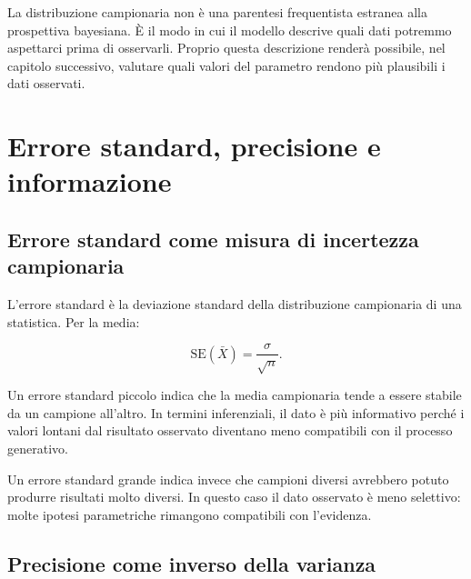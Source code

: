 \documentclass[
  italian,
  letterpaper,
  a4paper,
  11pt,
  open=any]{scrbook}
\theoremstyle{plain}
\theoremstyle{definition}
\theoremstyle{definition}
\theoremstyle{remark}
\begin{document}
\begin{tcolorbox}[enhanced jigsaw, arc=.35mm, bottomrule=.15mm, bottomtitle=1mm, breakable, colback=white, colbacktitle=quarto-callout-important-color!10!white, colframe=quarto-callout-important-color-frame, coltitle=black, left=2mm, leftrule=.75mm, opacityback=0, opacitybacktitle=0.6, rightrule=.15mm, title=\textcolor{quarto-callout-important-color}{\faExclamation}\hspace{0.5em}{Dal campione all'evidenza}, titlerule=0mm, toprule=.15mm, toptitle=1mm]

La distribuzione campionaria non è una parentesi frequentista estranea
alla prospettiva bayesiana. È il modo in cui il modello descrive quali
dati potremmo aspettarci prima di osservarli. Proprio questa descrizione
renderà possibile, nel capitolo successivo, valutare quali valori del
parametro rendono più plausibili i dati osservati.

\end{tcolorbox}

\section{Errore standard, precisione e
informazione}\label{sec-standard-error-precision-information}

\subsection{Errore standard come misura di incertezza
campionaria}\label{errore-standard-come-misura-di-incertezza-campionaria}

L'errore standard è la deviazione standard della distribuzione
campionaria di una statistica. Per la media:

\[
\text{SE}(\bar{X}) = \frac{\sigma}{\sqrt{n}}.
\]

Un errore standard piccolo indica che la media campionaria tende a
essere stabile da un campione all'altro. In termini inferenziali, il
dato è più informativo perché i valori lontani dal risultato osservato
diventano meno compatibili con il processo generativo.

Un errore standard grande indica invece che campioni diversi avrebbero
potuto produrre risultati molto diversi. In questo caso il dato
osservato è meno selettivo: molte ipotesi parametriche rimangono
compatibili con l'evidenza.

\subsection{Precisione come inverso della
varianza}\label{precisione-come-inverso-della-varianza}
\end{document}
